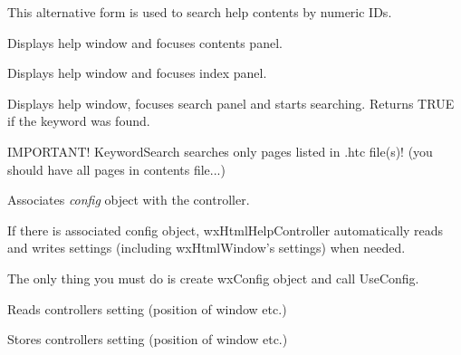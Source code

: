 
This alternative form is used to search help contents by numeric IDs.

\label{wxhtmlhelpcontrollerdisplaycontents}


Displays help window and focuses contents panel.

\label{wxhtmlhelpcontrollerdisplayindex}


Displays help window and focuses index panel.

\label{wxhtmlhelpcontrollerkeywordsearch}


Displays help window, focuses search panel and starts searching.
Returns TRUE if the keyword was found.

IMPORTANT! KeywordSearch searches only pages listed in .htc file(s)!
(you should have all pages in contents file...)

\label{wxhtmlhelpcontrolleruseconfig}


Associates {\it config} object with the controller.

If there is associated config object, wxHtmlHelpController automatically
reads and writes settings (including wxHtmlWindow's settings) when needed.

The only thing you must do is create wxConfig object and call UseConfig. 

\label{wxhtmlhelpcontrollerreadcustomization}


Reads controllers setting (position of window etc.)

\label{wxhtmlhelpcontrollerwritecustomization}


Stores controllers setting (position of window etc.)

